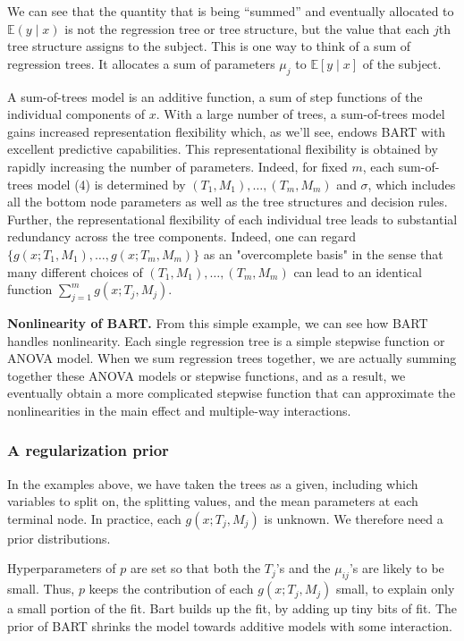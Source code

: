 \documentclass[a4paper,11pt]{article}
\begin{document}
We can see that the quantity that is being ``summed'' and eventually allocated to \( \mathbb{E}(y \mid x) \) is not the regression tree or tree structure, but the value that each \( j \)th tree structure assigns to the subject. This is one way to think of a sum of regression trees. It allocates a sum of parameters \( \mu_{j} \) to \( \mathbb{E}[y \mid x] \) of the subject.

A sum-of-trees model is an additive function, a sum of step functions of the individual components of \( x \). With a large number of trees, a sum-of-trees model gains increased representation flexibility which, as we'll see, endows BART with excellent predictive capabilities. This representational flexibility is obtained by rapidly increasing the number of parameters. Indeed, for fixed \( m \), each sum-of-trees model (4) is determined by \( (T_1, M_1), \ldots, (T_m, M_m) \) and \( \sigma \), which includes all the bottom node parameters as well as the tree structures and decision rules. Further, the representational flexibility of each individual tree leads to substantial redundancy across the tree components. Indeed, one can regard \( \{g(x; T_1, M_1), \ldots, g(x; T_m, M_m)\} \) as an "overcomplete basis" in the sense that many different choices of \( (T_1, M_1), \ldots, (T_m, M_m) \) can lead to an identical function \( \sum_{j=1}^m g(x; T_j, M_j) \).

\textbf{Nonlinearity of BART.} From this simple example, we can see how BART handles nonlinearity. Each single regression tree is a simple stepwise function or ANOVA model. When we sum regression trees together, we are actually summing together these ANOVA models or stepwise functions, and as a result, we eventually obtain a more complicated stepwise function that can approximate the nonlinearities in the main effect and multiple-way interactions.



\subsubsection{A regularization prior}
In the examples above, we have taken the trees as a given, including which variables to split on, the splitting values, and the mean parameters at each terminal node. In practice, each \( g(x; T_j, M_j) \) is unknown. We therefore need a prior distributions. 

Hyperparameters of $p$ are set so that both the \(T_j\)'s and the 
\(\mu_{ij}\)'s are likely to be small. Thus, $p$ keeps the contribution of each \(g(x; T_j, M_j)\) small, to 
explain only a small portion of the fit. Bart builds up the fit, by adding up tiny bits of fit.  The prior of BART shrinks the model towards additive models with some interaction.
\end{document}
